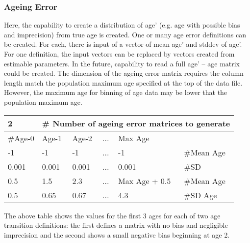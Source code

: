 \subsubsection{Ageing Error}
Here, the capability to create a distribution of age’ (e.g. age with possible bias and imprecision) from true age is created.  One or many age error definitions can be created.  For each, there is input of a vector of mean age’ and stddev of age’.  For one definition, the input vectors can be replaced by vectors created from estimable parameters.  In the future, capability to read a full age’ – age matrix could be created.  The dimension of the ageing error matrix requires the column length match the population maximum age specified at the top of the data file.  However, the maximum age for binning of age data may be lower that the population maximum age.  

\begin{center}
	\begin{tabular}{p{2cm} p{2cm} p{2cm} p{2cm} p{3cm} p{3cm} }
		\hline
		\multicolumn{1}{l}{2} & \multicolumn{5}{l}{\# Number of ageing error matrices to generate}\\
		\hline
		\#Age-0 & Age-1 & Age-2  &  ... & Max Age & \\
		\hline
		-1 & -1 & -1  & ... & -1  & \#Mean Age\\
		0.001 & 0.001 & 0.001 & ... & 0.001 & \#SD\\
		\hline
		0.5 & 1.5 & 2.3 & ... & Max Age + 0.5 & \#Mean Age\\
		0.5 & 0.65 & 0.67 & ... & 4.3 & \#SD Age \\
		\hline
	\end{tabular}
\end{center}
The above table shows the values for the first 3 ages for each of two age transition definitions: the first defines a matrix with no bias and negligible imprecision and the second shows a small negative bias beginning at age 2.

